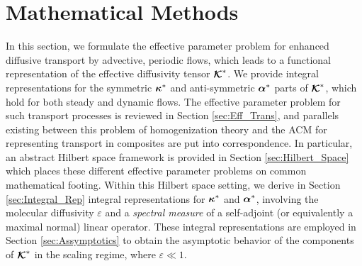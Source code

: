 \documentclass[11pt]{amsart}
\newcommand\Kbc{\mbox{\boldmath${\mathcal{K}}$}}
\newcommand\balpha{\mbox{\boldmath${\alpha}$}}
\newcommand\bkappa{\mbox{\boldmath${\kappa}$}}
\begin{document}
\section{Mathematical Methods}\label{sec:Mathematical_Methods} 
%
In this section, we formulate the effective parameter problem for
enhanced diffusive transport by advective, periodic flows, which leads
to a functional representation of the effective diffusivity tensor
$\Kbc^*$. We provide integral representations for the symmetric
$\bkappa^*$ and anti-symmetric $\balpha^*$ parts of $\Kbc^*$, which
hold for both steady and dynamic flows. The effective parameter
problem
\cite{McLaughlin:SIAM_JAM:780,Fannjiang:SIAM_JAM:333,Biferale:PF:2725} 
for such transport processes is reviewed in Section
\ref{sec:Eff_Trans}, and parallels existing between this problem
of homogenization theory \cite{Bensoussan:Book:1978} and the ACM for
representing transport in composites \cite{Golden:CMP-473} are put
into correspondence. In particular, an
abstract Hilbert space framework is provided in Section 
\ref{sec:Hilbert_Space} which places these different effective
parameter problems on common mathematical footing. Within this Hilbert
space setting, we derive in Section \ref{sec:Integral_Rep} integral
representations for $\bkappa^*$ and $\balpha^*$, involving the
molecular diffusivity $\varepsilon$ and a \emph{spectral measure} of a
self-adjoint (or equivalently a maximal normal) linear operator. These
integral representations are employed in Section
\ref{sec:Assymptotics} to obtain the asymptotic behavior of the
components of $\Kbc^*$ in the scaling regime, where $\varepsilon\ll1$.  
\end{document}
